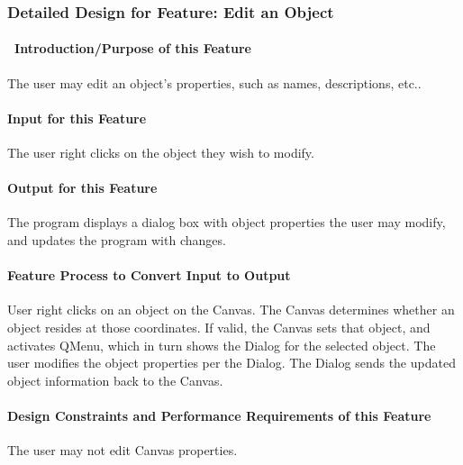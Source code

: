 \documentclass[twoside,letterpaper]{article}
\begin{document}
{\clearpage

\subsubsection{Detailed Design for Feature: Edit an Object}

\paragraph[\ Introduction/Purpose of this Feature]
{\ Introduction/Purpose of this Feature}
{\color{black}
The user may edit an object{\textquoteright}s properties, such as names, descriptions, etc..
}

\paragraph[Input for this Feature]{Input for this Feature}
{\color{black}
The user right clicks on the object they wish to modify.
}

\paragraph{Output for this Feature}
{\color{black}
The program displays a dialog box with object properties the user may modify, and updates the program with changes.
}

\paragraph{Feature Process to Convert Input to Output}
{\color{black}
User right clicks on an object on the Canvas. The Canvas determines whether an object resides at those coordinates. If valid, the Canvas sets that object, and activates QMenu, which in turn shows the Dialog for the selected object.
The user modifies the object properties per the Dialog.  The Dialog sends the updated object information back to the Canvas.
}

\paragraph{Design Constraints and Performance Requirements of this Feature}
{\color{black}
The user may not edit Canvas properties.
}
\bigskip
\bigskip

}
\end{document}
